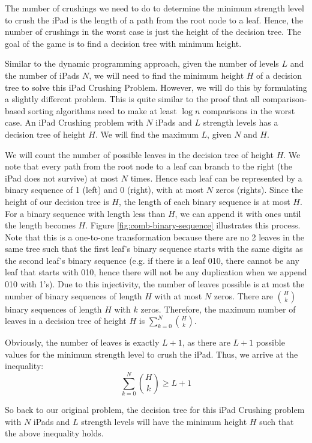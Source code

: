 \documentclass[12pt,a4paper,oneside]{report}
\begin{document}
The number of crushings we need to do to determine the minimum strength level to crush the iPad is the length of a path from the root node to a leaf. Hence, the number of crushings in the worst case is just the height of the decision tree. The goal of the game is to find a decision tree with minimum height.

Similar to the dynamic programming approach, given the number of levels $L$ and the number of iPads $N$, we will need to find the minimum height $H$ of a decision tree to solve this iPad Crushing Problem. However, we will do this by formulating a slightly different problem. This is quite similar to the proof that all comparison-based sorting algorithms need to make at least $\log n$ comparisons in the worst case. An iPad Crushing problem with $N$ iPads and $L$ strength levels has a decision tree of height $H$. We will find the maximum $L$, given $N$ and $H$.

We will count the number of possible leaves in the decision tree of height $H$. We note that every path from the root node to a leaf can branch to the right (the iPad does not survive) at most $N$ times. Hence each leaf can be represented by a binary sequence of 1 (left) and 0 (right), with at most $N$ zeros (rights). Since the height of our decision tree is $H$, the length of each binary sequence is at most $H$. For a binary sequence with length less than $H$, we can append it with ones until the length becomes $H$. Figure \ref{fig:comb-binary-sequence} illustrates this process. Note that this is a one-to-one transformation because there are no 2 leaves in the same tree such that the first leaf's binary sequence starts with the same digits as the second leaf's binary sequence (e.g. if there is a leaf 010, there cannot be any leaf that starts with 010, hence there will not be any duplication when we append 010 with 1's). Due to this injectivity, the number of leaves possible is at most the number of binary sequences of length $H$ with at most $N$ zeros. There are ${H \choose k}$ binary sequences of length $H$ with $k$ zeros. Therefore, the maximum number of leaves in a decision tree of height $H$ is $\sum_{k=0}^{N} {H \choose k}$.

Obviously, the number of  leaves is exactly $L+1$, as there are $L+1$ possible values for the minimum strength level to crush the iPad. Thus, we arrive at the inequality: \[\sum_{k=0}^{N} {H \choose k} \geq L+1\]

So back to our original problem, the decision tree for this iPad Crushing problem with $N$ iPads and $L$ strength levels will have the minimum height $H$ such that the above inequality holds.
\end{document}
